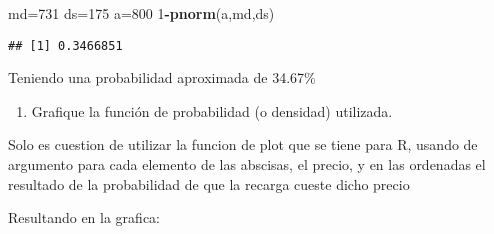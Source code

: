\documentclass[
]{article}
\newenvironment{Shaded}{\begin{snugshade}}{\end{snugshade}}
\newcommand{\DecValTok}[1]{\textcolor[rgb]{0.00,0.00,0.81}{#1}}
\newcommand{\FunctionTok}[1]{\textcolor[rgb]{0.13,0.29,0.53}{\textbf{#1}}}
\newcommand{\NormalTok}[1]{#1}
\newcommand{\OtherTok}[1]{\textcolor[rgb]{0.56,0.35,0.01}{#1}}
\newcommand{\SpecialCharTok}[1]{\textcolor[rgb]{0.81,0.36,0.00}{\textbf{#1}}}
\providecommand{\tightlist}{%
  \setlength{\itemsep}{0pt}\setlength{\parskip}{0pt}}
\begin{document}
\begin{Shaded}
\begin{Highlighting}[]
\NormalTok{md}\OtherTok{=}\DecValTok{731}
\NormalTok{ds}\OtherTok{=}\DecValTok{175}
\NormalTok{a}\OtherTok{=}\DecValTok{800}
\DecValTok{1}\SpecialCharTok{{-}}\FunctionTok{pnorm}\NormalTok{(a,md,ds)}
\end{Highlighting}
\end{Shaded}

\begin{verbatim}
## [1] 0.3466851
\end{verbatim}

Teniendo una probabilidad aproximada de 34.67\%

\begin{enumerate}
\def\labelenumi{\arabic{enumi}.}
\setcounter{enumi}{2}
\tightlist
\item
  Grafique la función de probabilidad (o densidad) utilizada.
\end{enumerate}

Solo es cuestion de utilizar la funcion de plot que se tiene para R,
usando de argumento para cada elemento de las abscisas, el precio, y en
las ordenadas el resultado de la probabilidad de que la recarga cueste
dicho precio

Resultando en la grafica:
\end{document}
